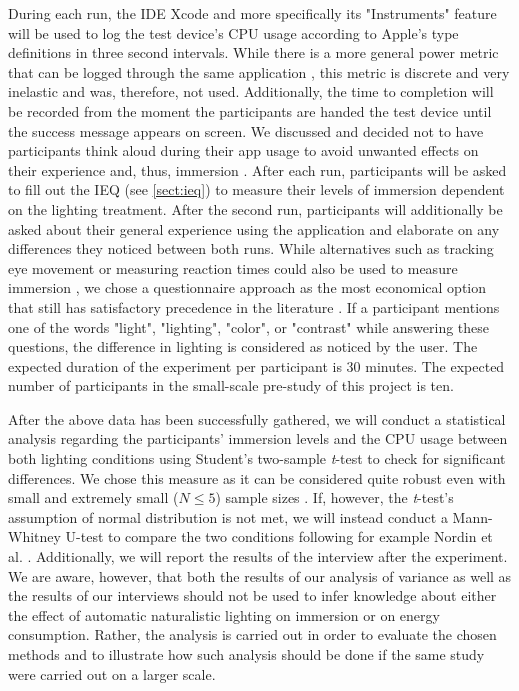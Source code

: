 \documentclass[12pt,twoside,english]{article}
\begin{document}
During each run, the IDE Xcode and more specifically its "Instruments" feature \cite{apple_xcode_nodate} will be used to log the test device's \gls{CPU} usage according to Apple's type definitions \cite{apple_system_nodate} in three second intervals.
While there is a more general power metric that can be logged through the same application \cite{apple_energy_nodate-1}, this metric is discrete and very inelastic and was, therefore, not used.
Additionally, the time to completion will be recorded from the moment the participants are handed the test device until the success message appears on screen.
We discussed and decided not to have participants think aloud during their app usage to avoid unwanted effects on their experience and, thus, immersion \cite{van_den_haak_retrospective_2003}.
After each run, participants will be asked to fill out the \gls{IEQ} (see \ref{sect:ieq}) to measure their levels of immersion dependent on the lighting treatment.
After the second run, participants will additionally be asked about their general experience using the application and elaborate on any differences they noticed between both runs.
While alternatives such as tracking eye movement or measuring reaction times could also be used to measure immersion \cite{jennett_measuring_2008}, we chose a questionnaire approach as the most economical option that still has satisfactory precedence in the literature \cite{boyle_engagement_2012}.
If a participant mentions one of the words "light", "lighting", "color", or "contrast" while answering these questions, the difference in lighting is considered as noticed by the user.
The expected duration of the experiment per participant is 30 minutes.
The expected number of participants in the small-scale pre-study of this project is ten.

After the above data has been successfully gathered, we will conduct a statistical analysis regarding the participants' immersion levels and the CPU usage between both lighting conditions using Student's two-sample \textit{t}-test to check for significant differences.
We chose this measure as it can be considered quite robust even with small and extremely small ($ N \leq 5 $) sample sizes \cite{de_winter_using_2013}.
If, however, the \textit{t}-test's assumption of normal distribution is not met, we will instead conduct a Mann-Whitney U-test to compare the two conditions following for example Nordin et al. \cite{nordin_attention_2013}.
Additionally, we will report the results of the interview after the experiment.
We are aware, however, that both the results of our analysis of variance as well as the results of our interviews should not be used to infer knowledge about either the effect of automatic naturalistic lighting on immersion or on energy consumption.
Rather, the analysis is carried out in order to evaluate the chosen methods and to illustrate how such analysis should be done if the same study were carried out on a larger scale.
\end{document}

